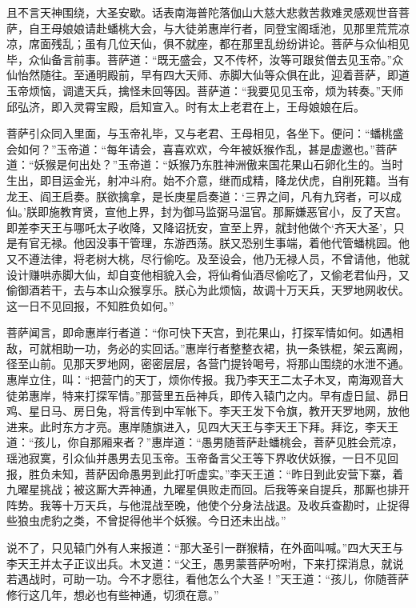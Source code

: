 \documentclass[12pt]{lsbook}
\begin{document}
且不言天神围绕，大圣安歇。话表南海普陀落伽山大慈大悲救苦救难灵感观世音菩萨，自王母娘娘请赴蟠桃大会，与大徒弟惠岸行者，同登宝阁瑶池，见那里荒荒凉凉，席面残乱；虽有几位天仙，俱不就座，都在那里乱纷纷讲论。菩萨与众仙相见毕，众仙备言前事。菩萨道：“既无盛会，又不传杯，汝等可跟贫僧去见玉帝。”众仙怡然随往。至通明殿前，早有四大天师、赤脚大仙等众俱在此，迎着菩萨，即道玉帝烦恼，调遣天兵，擒怪未回等因。菩萨道：“我要见见玉帝，烦为转奏。”天师邱弘济，即入灵霄宝殿，启知宣入。时有太上老君在上，王母娘娘在后。

菩萨引众同入里面，与玉帝礼毕，又与老君、王母相见，各坐下。便问：“蟠桃盛会如何？”玉帝道：“每年请会，喜喜欢欢，今年被妖猴作乱，甚是虚邀也。”菩萨道：“妖猴是何出处？”玉帝道：“妖猴乃东胜神洲傲来国花果山石卵化生的。当时生出，即目运金光，射冲斗府。始不介意，继而成精，降龙伏虎，自削死籍。当有龙王、阎王启奏。朕欲擒拿，是长庚星启奏道：‘三界之间，凡有九窍者，可以成仙。’朕即施教育贤，宣他上界，封为御马监弼马温官。那厮嫌恶官小，反了天宫。即差李天王与哪吒太子收降，又降诏抚安，宣至上界，就封他做个‘齐天大圣’，只是有官无禄。他因没事干管理，东游西荡。朕又恐别生事端，着他代管蟠桃园。他又不遵法律，将老树大桃，尽行偷吃。及至设会，他乃无禄人员，不曾请他，他就设计赚哄赤脚大仙，却自变他相貌入会，将仙肴仙酒尽偷吃了，又偷老君仙丹，又偷御酒若干，去与本山众猴享乐。朕心为此烦恼，故调十万天兵，天罗地网收伏。这一日不见回报，不知胜负如何。”

菩萨闻言，即命惠岸行者道：“你可快下天宫，到花果山，打探军情如何。如遇相敌，可就相助一功，务必的实回话。”惠岸行者整整衣裙，执一条铁棍，架云离阙，径至山前。见那天罗地网，密密层层，各营门提铃喝号，将那山围绕的水泄不通。惠岸立住，叫：“把营门的天丁，烦你传报。我乃李天王二太子木叉，南海观音大徒弟惠岸，特来打探军情。”那营里五岳神兵，即传入辕门之内。早有虚日鼠、昴日鸡、星日马、房日兔，将言传到中军帐下。李天王发下令旗，教开天罗地网，放他进来。此时东方才亮。惠岸随旗进入，见四大天王与李天王下拜。拜讫，李天王道：“孩儿，你自那厢来者？”惠岸道：“愚男随菩萨赴蟠桃会，菩萨见胜会荒凉，瑶池寂寞，引众仙并愚男去见玉帝。玉帝备言父王等下界收伏妖猴，一日不见回报，胜负未知，菩萨因命愚男到此打听虚实。”李天王道：“昨日到此安营下寨，着九曜星挑战；被这厮大弄神通，九曜星俱败走而回。后我等亲自提兵，那厮也排开阵势。我等十万天兵，与他混战至晚，他使个分身法战退。及收兵查勘时，止捉得些狼虫虎豹之类，不曾捉得他半个妖猴。今日还未出战。”

说不了，只见辕门外有人来报道：“那大圣引一群猴精，在外面叫喊。”四大天王与李天王并太子正议出兵。木叉道：“父王，愚男蒙菩萨吩咐，下来打探消息，就说若遇战时，可助一功。今不才愿往，看他怎么个大圣！”天王道：“孩儿，你随菩萨修行这几年，想必也有些神通，切须在意。”
\end{document}

